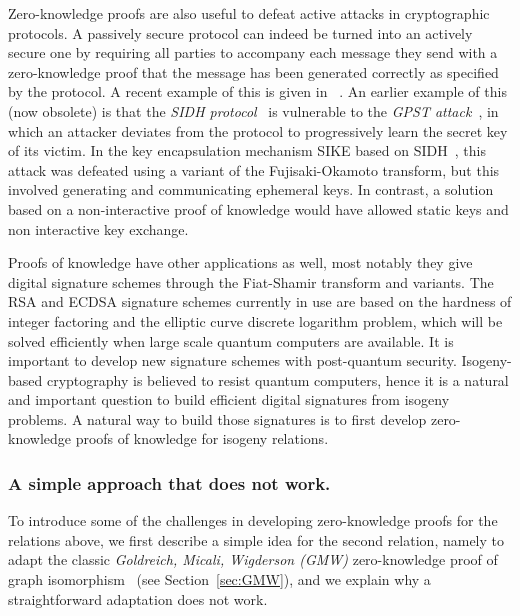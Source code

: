 \documentclass{llncs}
\begin{document}
Zero-knowledge proofs are also useful to defeat active attacks in cryptographic protocols. A passively secure protocol can indeed be turned into an actively secure one by requiring all parties to accompany each message they send with a zero-knowledge proof that the message has been generated correctly as specified by the protocol.
%
A recent example of this is given in ~\cite{cryptoeprint:2022/1469}.
An earlier example of this (now obsolete) is that the \emph{SIDH protocol}~\cite{DFJP14} is vulnerable to the \emph{GPST attack}~\cite{GPST16}, in which an attacker deviates from the protocol to progressively learn the secret key of its victim. 
In the key encapsulation mechanism SIKE based on SIDH~\cite{sike2017}, this attack was defeated using a variant of the Fujisaki-Okamoto transform, but this involved generating and communicating ephemeral keys. In contrast, a solution based on a non-interactive proof of knowledge would have allowed static keys and non interactive key exchange.



Proofs of knowledge have other applications as well, most notably they give digital signature schemes through the Fiat-Shamir transform and variants. 
%
The RSA and ECDSA signature schemes currently in use are based on the hardness of integer factoring and the elliptic curve discrete logarithm problem, which will be solved efficiently when large scale quantum computers are available.
It is important to develop new signature schemes with post-quantum security.
%
Isogeny-based cryptography is believed to resist quantum computers, hence it is a natural and important question to build efficient digital signatures from isogeny problems. A natural way to build those signatures is to first develop zero-knowledge proofs of knowledge for isogeny relations.









\subsubsection{A simple approach that does not work.}\label{sec:simple}


               
To introduce some of the challenges in developing zero-knowledge proofs for the relations above, we first describe a simple idea for the second relation, namely to adapt the classic \emph{Goldreich, Micali, Wigderson (GMW)} zero-knowledge proof of graph isomorphism~\cite{GMW} (see Section~\ref{sec:GMW}), and we explain why a straightforward adaptation does not work. 
\end{document}
